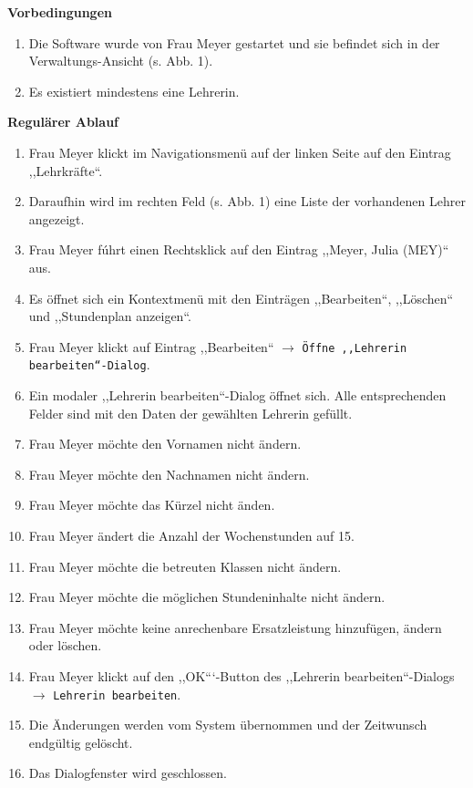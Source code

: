 \documentclass[fontsize=12pt,paper=a4,twoside]{scrartcl}
\begin{document}
\textbf{Vorbedingungen}
\begin{enumerate}
\item Die Software wurde von Frau Meyer gestartet und sie befindet sich in der Verwaltungs-Ansicht (s. Abb. 1).
\item Es existiert mindestens eine Lehrerin.
\end{enumerate}
\vspace{5pt}


\textbf{Regulärer Ablauf}
\begin{enumerate}
\item Frau Meyer klickt im Navigationsmenü auf der linken Seite auf den Eintrag ,,Lehrkr\"afte``.
\item Daraufhin wird im rechten Feld (s. Abb. 1) eine Liste der vorhandenen Lehrer angezeigt.
\item Frau Meyer f\'uhrt einen Rechtsklick auf den Eintrag ,,Meyer, Julia (MEY)`` aus.
\item Es \"offnet sich ein Kontextmen\"u mit den Eintr\"agen ,,Bearbeiten``, ,,L\"oschen`` und ,,Stundenplan anzeigen``.
\item Frau Meyer klickt auf Eintrag ,,Bearbeiten`` $\rightarrow$ \texttt{Öffne ,,Lehrerin bearbeiten``-Dialog}.
\item Ein modaler ,,Lehrerin bearbeiten``-Dialog öffnet sich. Alle entsprechenden Felder sind mit den Daten der gewählten Lehrerin gefüllt.
\item Frau Meyer möchte den Vornamen nicht ändern.
\item Frau Meyer möchte den Nachnamen nicht ändern.
\item Frau Meyer möchte das Kürzel nicht änden.
\item Frau Meyer ändert die Anzahl der Wochenstunden auf 15.
\item Frau Meyer möchte die betreuten Klassen nicht ändern.
\item Frau Meyer möchte die möglichen Stundeninhalte nicht ändern.
\item Frau Meyer möchte keine anrechenbare Ersatzleistung hinzufügen, ändern oder löschen.
\item Frau Meyer klickt auf den ,,OK```-Button des ,,Lehrerin bearbeiten``-Dialogs $\rightarrow$ \texttt{Lehrerin bearbeiten}.
\item Die Änderungen werden vom System übernommen und der Zeitwunsch endgültig gelöscht.
\item Das Dialogfenster wird geschlossen.
\end{enumerate}
\vspace{5pt}
\end{document}
